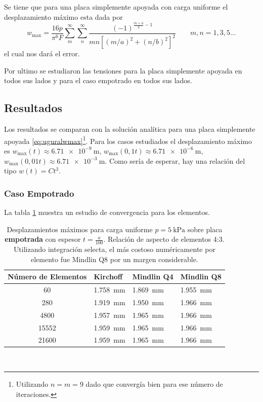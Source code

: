 \documentclass[onecolumn,10pt,titlepage]{article}
\begin{document}
Se tiene que para una placa simplemente apoyada con carga uniforme el desplazamiento máximo esta dada por \citep{ugural2003advanced}
\begin{equation}\label{eq:uguralwmax}
w_{\max }=\frac{16 p}{\pi^{6} F} \sum_{m}^{\infty} \sum_{n}^{\infty} \frac{(-1)^{\frac{m+n}{2}-1}}{m n\left[(m / a)^{2}+(n / b)^{2}\right]^{2}}\qquad m,n = 1,3,5 \ldots
\end{equation}
el cual nos dará el error.

Por ultimo se estudiaron las tensiones para la placa simplemente apoyada en todos sus lados y para el caso empotrado en todos sus lados.

\subsection{Resultados}
Los resultados se comparan con la solución analítica para una placa simplemente apoyada \eqref{eq:uguralwmax}\footnote{Utilizando $n=m=9$ dado que convergía bien para ese número de iteraciones.}. Para los casos estudiados el desplazamiento máximo es $w_{\max}(t)\approx \SI{6,71e-9}{\meter}$, $w_{\max}(0,1t)\approx \SI{6,71e-6}{\meter}$, $w_{\max}(0,01t)\approx \SI{6,71e-3}{\meter}$. Como sería de esperar, hay una relación del tipo $w(t)=Ct^3$.
\subsubsection*{Caso Empotrado}
La tabla \ref{tab:Convergencia} muestra un estudio de convergencia para los elementos. 
\begin{table}[htb!] 
	\centering
	\begin{tabular}{clll}
		Número de Elementos& Kirchoff & Mindlin Q4 & Mindlin Q8  \\ \hline
		60  & \SI{1,758}{\milli \meter}  &  \SI{1,869}{\milli \meter}  & \SI{1,955}{\milli \meter} \\
		280  & \SI{1,919}{\milli \meter}  &  \SI{1,950}{\milli \meter}  & \SI{1,966}{\milli \meter} \\
		4800 &\SI{1,957}{\milli \meter}  &   \SI{1,965}{\milli \meter} &\SI{1,966}{\milli \meter} \\
		15552 &  \SI{1,959}{\milli \meter}   &  \SI{1,965}{\milli \meter}  & \SI{1,966}{\milli \meter}\\
		21600&  \SI{1,959}{\milli \meter}& \SI{1,965}{\milli \meter}  & \SI{1,966}{\milli \meter}
	\end{tabular}\
	\caption{Desplazamientos máximos para carga uniforme $p=\SI{5}{\kilo \pascal}$ sobre placa \textbf{empotrada} con espesor $t=\frac{a}{100}$. Relación de aspecto de elementos 4:3. Utilizando integración selecta\citep{cook2007concepts}, el más costoso numéricamente por elemento fue Mindlin Q8 por un margen considerable.}
	\label{tab:Convergencia}
\end{table}
\end{document}
